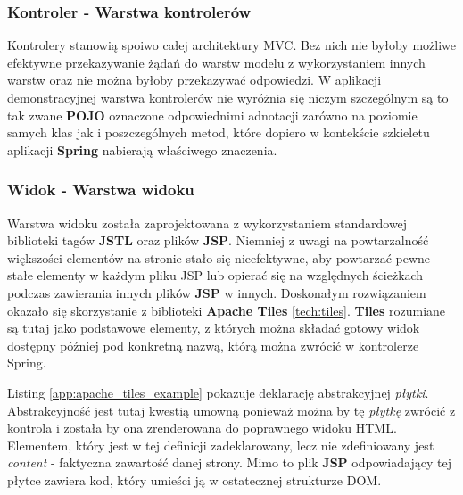 		\subsubsection{Kontroler - Warstwa kontrolerów}
			Kontrolery stanowią spoiwo całej architektury MVC. Bez nich nie byłoby możliwe efektywne przekazywanie żądań do warstw modelu z wykorzystaniem
			innych warstw oraz nie można byłoby przekazywać odpowiedzi. W aplikacji demonstracyjnej warstwa kontrolerów nie wyróżnia się niczym szczególnym
			są to tak zwane \textbf{POJO} oznaczone odpowiednimi adnotacji zarówno na poziomie samych klas jak i poszczególnych metod, które dopiero
			w kontekście szkieletu aplikacji \textbf{Spring} nabierają właściwego znaczenia.
		\subsubsection{Widok - Warstwa widoku}
			Warstwa widoku została zaprojektowana z wykorzystaniem standardowej biblioteki tagów \textbf{JSTL} oraz plików \textbf{JSP}. Niemniej
			z uwagi na powtarzalność większości elementów na stronie stało się nieefektywne, aby powtarzać pewne stałe elementy w każdym pliku JSP
			lub opierać się na względnych ścieżkach podczas zawierania innych plików \textbf{JSP} w innych. Doskonałym rozwiązaniem okazało
			się skorzystanie z biblioteki \textbf{Apache Tiles} \ref{tech:tiles}. \textbf{Tiles} rozumiane są tutaj jako podstawowe elementy, z których
			można składać gotowy widok dostępny później pod konkretną nazwą, którą można zwrócić w kontrolerze Spring.
			Listing \ref{app:apache_tiles_example} pokazuje deklarację abstrakcyjnej \textit{płytki}. Abstrakcyjność jest tutaj kwestią umowną ponieważ
			można by tę \textit{płytkę} zwrócić z kontrola i została by ona zrenderowana do poprawnego widoku HTML. Elementem, który jest w tej definicji
			zadeklarowany, lecz nie zdefiniowany jest \textit{content} - faktyczna zawartość danej strony. Mimo to plik \textbf{JSP} odpowiadający tej płytce
			zawiera kod, który umieści ją w ostatecznej strukturze DOM. 
		
